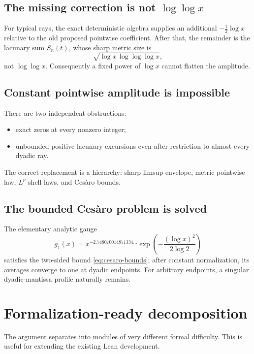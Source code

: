 \documentclass[11pt,oneside]{article}
\theoremstyle{definition}
\theoremstyle{remark}
\begin{document}
\subsection{The missing correction is not \texorpdfstring{$\log\log x$}{log log x}}

For typical rays, the exact deterministic algebra supplies an additional
$-\tfrac12\log x$ relative to the old proposed pointwise coefficient.  After that, the
remainder is the lacunary sum $S_n(t)$, whose sharp metric size is
\[
 \sqrt{\log x\,\log\log\log x},
\]
not $\log\log x$.  Consequently a fixed power of $\log x$ cannot flatten the amplitude.

\subsection{Constant pointwise amplitude is impossible}

There are two independent obstructions:
\begin{itemize}
\item exact zeros at every nonzero integer;
\item unbounded positive lacunary excursions even after restriction to almost every dyadic ray.
\end{itemize}
The correct replacement is a hierarchy: sharp limsup envelope, metric pointwise law,
$L^p$ shell laws, and Ces\`aro bounds.

\subsection{The bounded Ces\`aro problem is solved}

The elementary analytic gauge
\[
 g_1(x)=x^{-2.748070014871334\ldots}
 \exp\!\left(-\frac{(\log x)^2}{2\log2}\right)
\]
satisfies the two-sided bound \eqref{eq:cesaro-bounds}; after constant normalization,
its averages converge to one at dyadic endpoints.  For arbitrary endpoints, a singular
dyadic-mantissa profile naturally remains.

\section{Formalization-ready decomposition}\label{sec:formalization}

The argument separates into modules of very different formal difficulty.  This is useful
for extending the existing Lean development.
\end{document}
